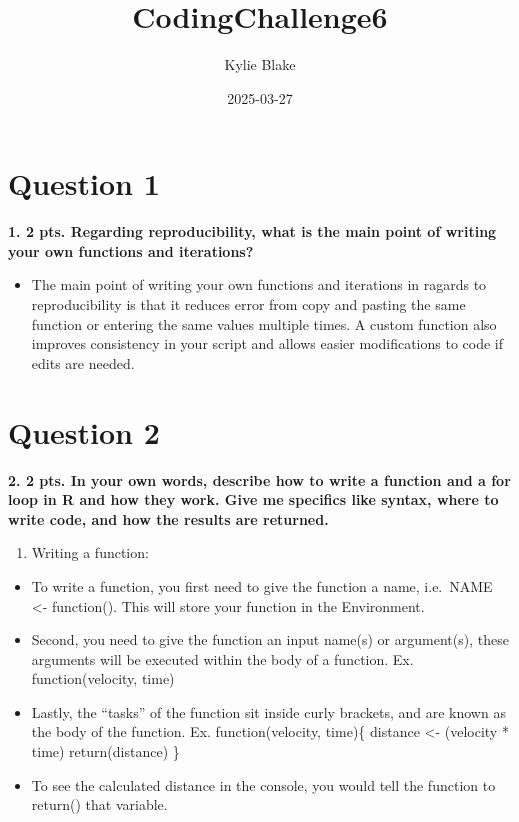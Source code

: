 \documentclass[
]{article}
\title{CodingChallenge6}
\author{Kylie Blake}
\date{2025-03-27}
\providecommand{\tightlist}{%
  \setlength{\itemsep}{0pt}\setlength{\parskip}{0pt}}
\begin{document}
\maketitle

{
\setcounter{tocdepth}{2}
\tableofcontents
}
\section{Question 1}\label{question-1}

\textbf{1. 2 pts. Regarding reproducibility, what is the main point of
writing your own functions and iterations? }

\begin{itemize}
\tightlist
\item
  The main point of writing your own functions and iterations in ragards
  to reproducibility is that it reduces error from copy and pasting the
  same function or entering the same values multiple times. A custom
  function also improves consistency in your script and allows easier
  modifications to code if edits are needed.
\end{itemize}

\section{Question 2}\label{question-2}

\textbf{2. 2 pts. In your own words, describe how to write a function
and a for loop in R and how they work. Give me specifics like syntax,
where to write code, and how the results are returned.}

\begin{enumerate}
\def\labelenumi{\alph{enumi}.}
\tightlist
\item
  Writing a function:
\end{enumerate}

\begin{itemize}
\item
  To write a function, you first need to give the function a name,
  i.e.~NAME \textless- function(). This will store your function in the
  Environment.
\item
  Second, you need to give the function an input name(s) or argument(s),
  these arguments will be executed within the body of a function. Ex.
  function(velocity, time)
\item
  Lastly, the ``tasks'' of the function sit inside curly brackets, and
  are known as the body of the function. Ex. function(velocity, time)\{
  distance \textless- (velocity * time) return(distance) \}
\item
  To see the calculated distance in the console, you would tell the
  function to return() that variable.
\end{itemize}
\end{document}
